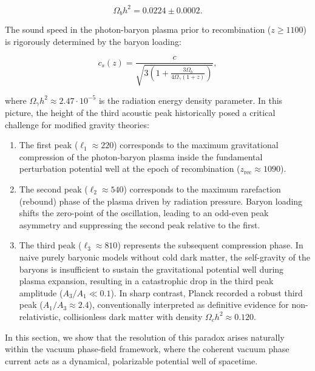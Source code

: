 \documentclass[11pt,a4paper]{article}
\theoremstyle{definition}
\begin{document}
\begin{equation}\label{eq:4.40a}\tag{4.40a}
\Omega_b h^2 = 0.0224 \pm 0.0002.
\end{equation}

The sound speed in the photon-baryon plasma prior to recombination ($z \ge 1100$) is rigorously determined by the baryon loading:

\begin{equation}\label{eq:4.40b}\tag{4.40b}
c_s(z) = \frac{c}{\sqrt{3 \left( 1 + \frac{3 \Omega_b}{4 \Omega_\gamma (1+z)} \right)}},
\end{equation}

where $\Omega_\gamma h^2 \approx 2.47 \cdot 10^{-5}$ is the radiation energy density parameter. In this picture, the height of the third acoustic peak historically posed a critical challenge for modified gravity theories:

\begin{enumerate}
\item The first peak ($\ell_1 \approx 220$) corresponds to the maximum gravitational compression of the photon-baryon plasma inside the fundamental perturbation potential well at the epoch of recombination ($z_{\text{rec}} \approx 1090$).

\item The second peak ($\ell_2 \approx 540$) corresponds to the maximum rarefaction (rebound) phase of the plasma driven by radiation pressure. Baryon loading shifts the zero-point of the oscillation, leading to an odd-even peak asymmetry and suppressing the second peak relative to the first.

\item The third peak ($\ell_3 \approx 810$) represents the subsequent compression phase. In naive purely baryonic models without cold dark matter, the self-gravity of the baryons is insufficient to sustain the gravitational potential well during plasma expansion, resulting in a catastrophic drop in the third peak amplitude ($A_3 / A_1 \ll 0.1$). In sharp contrast, Planck recorded a robust third peak ($A_1 / A_3 \approx 2.4$), conventionally interpreted as definitive evidence for non-relativistic, collisionless dark matter with density $\Omega_c h^2 \approx 0.120$.
\end{enumerate}

In this section, we show that the resolution of this paradox arises naturally within the vacuum phase-field framework, where the coherent vacuum phase current acts as a dynamical, polarizable potential well of spacetime.
\end{document}
